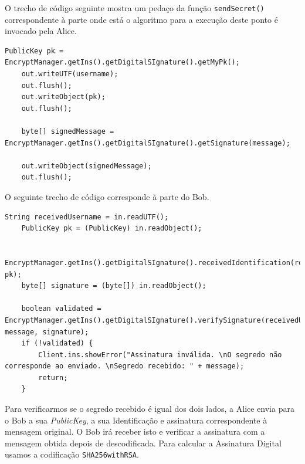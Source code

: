 O trecho de código seguinte mostra um pedaço da função \texttt{sendSecret()} correspondente à parte onde está o algoritmo para a execução deste ponto é invocado pela Alice.
\begin{lstlisting}[caption=Trecho de código usado no projeto.]
    PublicKey pk = EncryptManager.getIns().getDigitalSIgnature().getMyPk();
    out.writeUTF(username);
    out.flush();
    out.writeObject(pk);
    out.flush();
   
    byte[] signedMessage = EncryptManager.getIns().getDigitalSIgnature().getSignature(message);

    out.writeObject(signedMessage);
    out.flush();
\end{lstlisting}
O seguinte trecho de código corresponde à parte do Bob.
\begin{lstlisting}[caption=Trecho de código usado no projeto.]
    String receivedUsername = in.readUTF();
    PublicKey pk = (PublicKey) in.readObject();
    
    EncryptManager.getIns().getDigitalSIgnature().receivedIdentification(receivedUsername, pk);
    byte[] signature = (byte[]) in.readObject();
    
    boolean validated = EncryptManager.getIns().getDigitalSIgnature().verifySignature(receivedUsername, message, signature);
    if (!validated) {
        Client.ins.showError("Assinatura inválida. \nO segredo não corresponde ao enviado. \nSegredo recebido: " + message);
        return;
    }
\end{lstlisting}
Para verificarmos se o segredo recebido é igual dos dois lados, a Alice envia para o Bob a sua \textit{PublicKey}, a sua Identificação e assinatura correspondente à mensagem original. O Bob irá receber isto e verificar a assinatura com a mensagem obtida depois de descodificada.
Para calcular a Assinatura Digital usamos a codificação \texttt{SHA256withRSA}.
